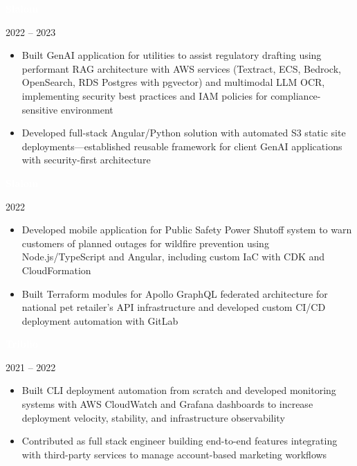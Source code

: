 \documentclass[10pt,letterpaper]{article}
\newcommand{\companyBlock}[3]{%
    \vspace{4pt}
    \noindent\colorbox{#3}{\textcolor{white}{\scriptsize\textbf{\hspace{3pt}#1\hspace{3pt}}}}
    \vspace{2pt}
}
\begin{document}
{\begin{minipage}[t][8.6in][t]{\paperwidth}
\begin{minipage}[t]{4in}
\companyBlock{Slalom}{2022 – 2023}{company1}

\noindent{\small\textbf{\textcolor{darktext}{Senior Consultant - Solution Architect}}} \hfill {\scriptsize\textcolor{mediumtext}{2022 – 2023}}
\begin{itemize}
\renewcommand{\labelitemi}{\textcolor{company1}{\rule{4pt}{4pt}}}
    \item{\scriptsize\textcolor{darktext}{Built GenAI application for utilities to assist regulatory drafting using performant RAG architecture with AWS services (Textract, ECS, Bedrock, OpenSearch, RDS Postgres with pgvector) and multimodal LLM OCR, implementing security best practices and IAM policies for compliance-sensitive environment}}
    \item{\scriptsize\textcolor{darktext}{Developed full-stack Angular/Python solution with automated S3 static site deployments—established reusable framework for client GenAI applications with security-first architecture}}
\end{itemize}
\vspace{4pt}

\companyBlock{Slalom}{2022}{company1}

\noindent{\small\textbf{\textcolor{darktext}{Cloud Architect / Full Stack Engineer}}} \hfill {\scriptsize\textcolor{mediumtext}{2022}}
\begin{itemize}
\renewcommand{\labelitemi}{\textcolor{company1}{\rule{4pt}{4pt}}}
    \item{\scriptsize\textcolor{darktext}{Developed mobile application for Public Safety Power Shutoff system to warn customers of planned outages for wildfire prevention using Node.js/TypeScript and Angular, including custom IaC with CDK and CloudFormation}}
    \item{\scriptsize\textcolor{darktext}{Built Terraform modules for Apollo GraphQL federated architecture for national pet retailer's API infrastructure and developed custom CI/CD deployment automation with GitLab}}
\end{itemize}
\vspace{4pt}

\companyBlock{Triblio}{2021 – 2022}{company2}

\noindent{\small\textbf{\textcolor{darktext}{Software/DevOps Engineer}}} \hfill {\scriptsize\textcolor{mediumtext}{2021 – 2022}}
\begin{itemize}
\renewcommand{\labelitemi}{\textcolor{company2}{\rule{4pt}{4pt}}}
    \item{\scriptsize\textcolor{darktext}{Built CLI deployment automation from scratch and developed monitoring systems with AWS CloudWatch and Grafana dashboards to increase deployment velocity, stability, and infrastructure observability}}
    \item{\scriptsize\textcolor{darktext}{Contributed as full stack engineer building end-to-end features integrating with third-party services to manage account-based marketing workflows}}
\end{itemize}
\vspace{4pt}


\end{minipage}
\end{minipage}}
\end{document}
